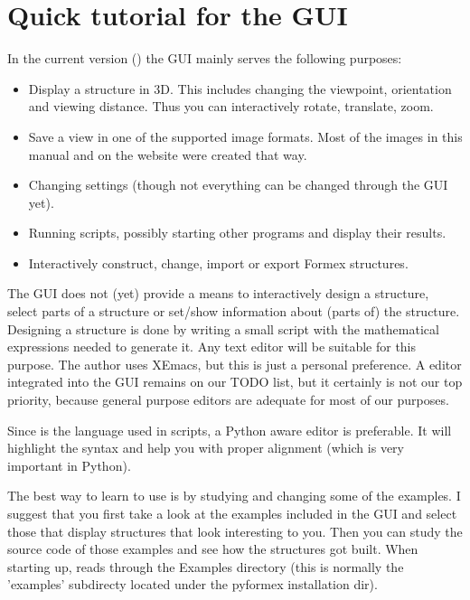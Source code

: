 \section{Quick tutorial for the \pyformex GUI}
\label{sec:gui-tutorial}
In the current version (\version) the GUI mainly serves the following purposes:
\begin{itemize}
\item Display a structure in 3D. This includes changing the viewpoint, orientation and viewing distance. Thus you can interactively rotate, translate, zoom.
\item Save a view in one of the supported image formats. Most of the images in this manual and on the \pyformex{} website were created that way. 
\item Changing \pyformex settings (though not everything can be changed through the GUI yet).
\item Running \pyformex scripts, possibly starting other programs and display their results.
\item Interactively construct, change, import or export Formex structures. 
\end{itemize}

The GUI does not (yet) provide a means to interactively design a structure, select parts of a structure or set/show information about (parts of) the structure. Designing a structure is done by writing a small script with the mathematical expressions needed to generate it. Any text editor will be suitable for this purpose. The author uses XEmacs, but this is just a personal preference. 
A \pyformex editor integrated into the GUI remains on our TODO list, but it certainly is not our top priority, because general purpose editors are adequate for most of our purposes. 

Since  is the language used in \pyformex scripts, a Python aware editor is preferable. It will highlight the syntax and help you with proper alignment (which is very important in Python). 
 

The best way to learn to use \pyformex is by studying and changing some of the examples. I suggest that you first take a look at the examples included in the \pyformex GUI and select those that display structures that look interesting to you. Then you can study the source code of those examples and see how the structures got built. 
When starting up, \pyformex reads through the Examples directory (this is normally the 'examples' subdirecty located under the pyformex installation dir).  


